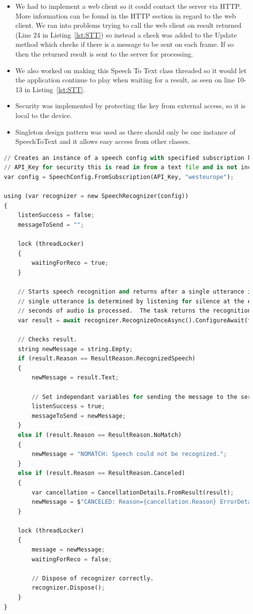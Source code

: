 \begin{itemize}
  \item We had to implement a web client so it could contact the server via HTTP. More information can be found in the HTTP section in regard to the web client. We ran into problems trying to call the web client on result returned (Line 24 in Listing~\ref{lst:STT}) so instead a check was added to the Update method which checks if there is a message to be sent on each frame. If so then the returned result is sent to the server for processing.
  \item We also worked on making this Speech To Text class threaded so it would let the application continue to play when waiting for a result, as seen on line 10-13 in Listing~\ref{lst:STT}.
  \item Security was implemented by protecting the key from external access, so it is local to the device.
  \item Singleton design pattern was used as there should only be one instance of SpeechToText and it allows easy access from other classes.
\end{itemize}

\begin{lstlisting}[caption={Speech To Text - Setup and request},label={lst:STT},language=python]
// Creates an instance of a speech config with specified subscription key and service region.
// API_Key for security this is read in from a text file and is not included on Github. 
var config = SpeechConfig.FromSubscription(API_Key, "westeurope");

using (var recognizer = new SpeechRecognizer(config))
{
    listenSuccess = false;
    messageToSend = "";

    lock (threadLocker)
    {
        waitingForReco = true;
    }

    // Starts speech recognition and returns after a single utterance is recognized. The end of a
    // single utterance is determined by listening for silence at the end or until a maximum of 15
    // seconds of audio is processed.  The task returns the recognition text as result.
    var result = await recognizer.RecognizeOnceAsync().ConfigureAwait(false);

    // Checks result.
    string newMessage = string.Empty;
    if (result.Reason == ResultReason.RecognizedSpeech)
    {
        newMessage = result.Text;

        // Set independant variables for sending the message to the server.
        listenSuccess = true;
        messageToSend = newMessage;
    }
    else if (result.Reason == ResultReason.NoMatch)
    {
        newMessage = "NOMATCH: Speech could not be recognized.";
    }
    else if (result.Reason == ResultReason.Canceled)
    {
        var cancellation = CancellationDetails.FromResult(result);
        newMessage = $"CANCELED: Reason={cancellation.Reason} ErrorDetails={cancellation.ErrorDetails}";
    }

    lock (threadLocker)
    {
        message = newMessage;
        waitingForReco = false;

        // Dispose of recognizer correctly.
        recognizer.Dispose();
    }
}
\end{lstlisting}

